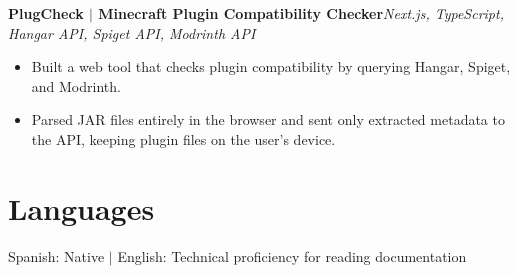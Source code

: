 \documentclass[10pt,letterpaper]{article}
\newcommand{\project}[2]{\textbf{#1}\hspace{3pt}\textit{\small #2}\par\vspace{-2pt}}
\begin{document}
\project{PlugCheck $|$ Minecraft Plugin Compatibility Checker}{Next.js, TypeScript, Hangar API, Spiget API, Modrinth API}
\begin{itemize}
  \item Built a web tool that checks plugin compatibility by querying Hangar, Spiget, and Modrinth.
  \item Parsed JAR files entirely in the browser and sent only extracted metadata to the API, keeping plugin files on the user's device.
\end{itemize}

\section*{Languages}
Spanish: Native $|$ English: Technical proficiency for reading documentation
\end{document}
